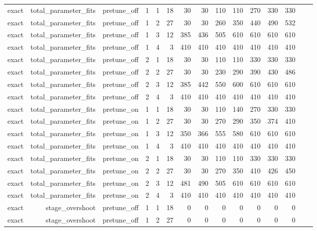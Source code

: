 \begin{table}[htbp]
\begin{tabular}{lrrrrrrrrrrrrrr}
exact & total\_parameter\_fits & pretune\_off & 1 & 1 & 18 & 30 & 30 & 110 & 110 & 270 & 330 & 330 &  &  \\
exact & total\_parameter\_fits & pretune\_off & 1 & 2 & 27 & 30 & 30 & 260 & 350 & 440 & 490 & 532 &  &  \\
exact & total\_parameter\_fits & pretune\_off & 1 & 3 & 12 & 385 & 436 & 505 & 610 & 610 & 610 & 610 &  &  \\
exact & total\_parameter\_fits & pretune\_off & 1 & 4 & 3 & 410 & 410 & 410 & 410 & 410 & 410 & 410 &  &  \\
exact & total\_parameter\_fits & pretune\_off & 2 & 1 & 18 & 30 & 30 & 110 & 110 & 330 & 330 & 330 &  &  \\
exact & total\_parameter\_fits & pretune\_off & 2 & 2 & 27 & 30 & 30 & 230 & 290 & 390 & 430 & 486 &  &  \\
exact & total\_parameter\_fits & pretune\_off & 2 & 3 & 12 & 385 & 442 & 550 & 600 & 610 & 610 & 610 &  &  \\
exact & total\_parameter\_fits & pretune\_off & 2 & 4 & 3 & 410 & 410 & 410 & 410 & 410 & 410 & 410 &  &  \\
exact & total\_parameter\_fits & pretune\_on & 1 & 1 & 18 & 30 & 30 & 110 & 140 & 270 & 330 & 330 &  &  \\
exact & total\_parameter\_fits & pretune\_on & 1 & 2 & 27 & 30 & 30 & 270 & 290 & 350 & 374 & 410 &  &  \\
exact & total\_parameter\_fits & pretune\_on & 1 & 3 & 12 & 350 & 366 & 555 & 580 & 610 & 610 & 610 &  &  \\
exact & total\_parameter\_fits & pretune\_on & 1 & 4 & 3 & 410 & 410 & 410 & 410 & 410 & 410 & 410 &  &  \\
exact & total\_parameter\_fits & pretune\_on & 2 & 1 & 18 & 30 & 30 & 110 & 110 & 330 & 330 & 330 &  &  \\
exact & total\_parameter\_fits & pretune\_on & 2 & 2 & 27 & 30 & 30 & 270 & 350 & 410 & 426 & 450 &  &  \\
exact & total\_parameter\_fits & pretune\_on & 2 & 3 & 12 & 481 & 490 & 505 & 610 & 610 & 610 & 610 &  &  \\
exact & total\_parameter\_fits & pretune\_on & 2 & 4 & 3 & 410 & 410 & 410 & 410 & 410 & 410 & 410 &  &  \\
exact & stage\_overshoot & pretune\_off & 1 & 1 & 18 & 0 & 0 & 0 & 0 & 0 & 0 & 0 &  &  \\
exact & stage\_overshoot & pretune\_off & 1 & 2 & 27 & 0 & 0 & 0 & 0 & 0 & 0 & 0 &  &  \\

\end{tabular}
\end{table}
